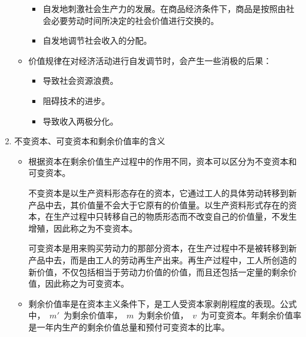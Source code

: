 \documentclass[device=pad,lang=cn,UTF8]{elegantbook}
\begin{document}
\begin{enumerate}
\begin{itemize}
\begin{itemize}
                \item 自发地刺激社会生产力的发展。在商品经济条件下，商品是按照由社会必要劳动时间所决定的社会价值进行交换的。
                \item 自发地调节社会收入的分配。
            \end{itemize}
            \item 价值规律在对经济活动进行自发调节时，会产生一些消极的后果：
            \begin{itemize}
                \item 导致社会资源浪费。
                \item 阻碍技术的进步。
                \item 导致收入两极分化。
            \end{itemize}
        \end{itemize}
        \item 不变资本、可变资本和剩余价值率的含义
        \begin{itemize}
            \item 根据资本在剩余价值生产过程中的作用不同，资本可以区分为不变资本和可变资本。\par
            不变资本是以生产资料形态存在的资本，它通过工人的具体劳动转移到新产品中去，其价值量不会大于它原有的价值量。以生产资料形式存在的资本，在生产过程中只转移自己的物质形态而不改变自己的价值量，不发生增殖，因此称之为不变资本。\par
            可变资本是用来购买劳动力的那部分资本，在生产过程中不是被转移到新产品中去，而是由工人的劳动再生产出来。再生产过程中，工人所创造的新价值，不仅包括相当于劳动力价值的价值，而且还包括一定量的剩余价值，因此称之为可变资本。
            \item 剩余价值率是在资本主义条件下，是工人受资本家剥削程度的表现。公式中，~$m'$~为剩余价值率，~$m$~为剩余价值，~$v$~为可变资本。年剩余价值率是一年内生产的剩余价值总量和预付可变资本的比率。
        \end{itemize}
    \end{enumerate}
\end{document}
